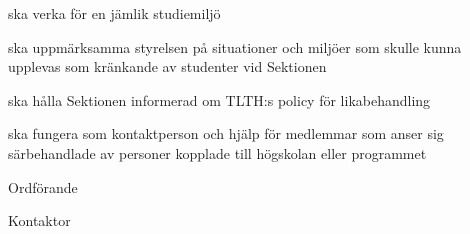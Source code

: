 \documentclass[../_main/handlingar.tex]{subfiles}
\begin{document}
\begin{attsatser}
{\begin{tightdashlist}
        \item ska verka för en jämlik studiemiljö
        \item ska uppmärksamma styrelsen på situationer och miljöer som skulle kunna upplevas som kränkande av studenter vid Sektionen
        \item ska hålla Sektionen informerad om TLTH:s policy för likabehandling
        \item ska fungera som kontaktperson och hjälp för medlemmar som anser sig särbehandlade av personer kopplade till högskolan eller programmet
    \end{tightdashlist}
    }
\end{attsatser}

\begin{signatures}{2}
    \ist
    \signature{\ordf}{Ordförande}
    \signature{\sekr}{Kontaktor}
\end{signatures}
\end{document}
